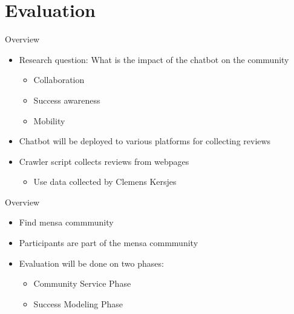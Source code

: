 \section{Evaluation}


\begin{frame}{Overview}
  \begin{itemize}
    \item Research question: What is the impact of the chatbot on the community
          \begin{itemize}
            \item Collaboration
            \item Success awareness
            \item Mobility
          \end{itemize}
    \item Chatbot will be deployed to various platforms for collecting reviews
    \item Crawler script collects reviews from webpages
          \begin{itemize}
            \item Use data collected by Clemens Kersjes
          \end{itemize}
  \end{itemize}
\end{frame}

\begin{frame}{Overview}
  \begin{itemize}
    \item Find mensa commmunity
    \item Participants are part of the mensa commmunity
    \item Evaluation will be done on two phases:
          \begin{itemize}
            \item  Community Service Phase
            \item Success Modeling Phase
          \end{itemize}
  \end{itemize}
\end{frame}


